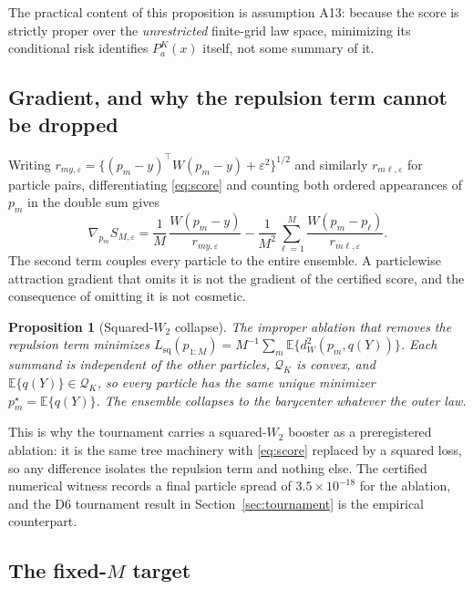 \documentclass[11pt,a4paper]{article}
\newtheorem{proposition}{Proposition}
\theoremstyle{definition}
\theoremstyle{remark}
\newcommand{\Qcal}{\mathcal{Q}}
\newcommand{\Exp}{\mathbb{E}}
\newcommand{\dW}{d_W}
\begin{document}
The practical content of this proposition is assumption A13: because the score
is strictly proper over the \emph{unrestricted} finite-grid law space, minimizing
its conditional risk identifies $P_a^K(x)$ itself, not some summary of it.

\subsection{Gradient, and why the repulsion term cannot be dropped}

Writing $r_{my,\varepsilon} = \{(p_m - y)^\top W (p_m - y) + \varepsilon^2\}^{1/2}$
and similarly $r_{m\ell,\varepsilon}$ for particle pairs, differentiating
\eqref{eq:score} and counting both ordered appearances of $p_m$ in the double sum
gives
\begin{equation}
\nabla_{p_m} S_{M,\varepsilon}
= \frac{1}{M}\,\frac{W(p_m - y)}{r_{my,\varepsilon}}
- \frac{1}{M^2}\sum_{\ell=1}^M \frac{W(p_m - p_\ell)}{r_{m\ell,\varepsilon}} .
\label{eq:grad}
\end{equation}
The second term couples every particle to the entire ensemble. A particlewise
attraction gradient that omits it is not the gradient of the certified score,
and the consequence of omitting it is not cosmetic.

\begin{proposition}[Squared-$W_2$ collapse]
The improper ablation that removes the repulsion term minimizes
$L_{\mathrm{sq}}(p_{1:M}) = M^{-1}\sum_m \Exp\{\dW^2(p_m, q(Y))\}$. Each summand
is independent of the other particles, $\Qcal_K$ is convex, and
$\Exp\{q(Y)\} \in \Qcal_K$, so every particle has the same unique minimizer
$p_m^\star = \Exp\{q(Y)\}$. The ensemble collapses to the barycenter whatever
the outer law.
\end{proposition}

This is why the tournament carries a squared-$W_2$ booster as a preregistered
ablation: it is the same tree machinery with \eqref{eq:score} replaced by a
squared loss, so any difference isolates the repulsion term and nothing else.
The certified numerical witness records a final particle spread of
$3.5 \times 10^{-18}$ for the ablation, and the D6 tournament result in
Section~\ref{sec:tournament} is the empirical counterpart.

\subsection{The fixed-$M$ target}
\label{sec:finiteM}
\end{document}
